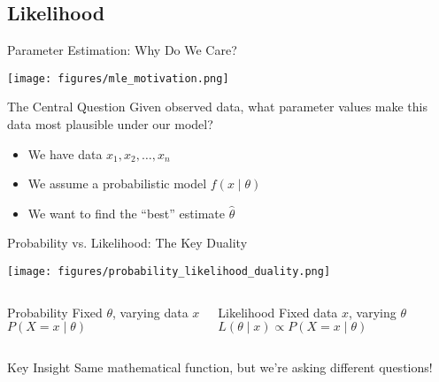 
\subsection{Likelihood}

\begin{frame}{Parameter Estimation: Why Do We Care?}
  \footnotesize
  \begin{center}
    \texttt{[image: figures/mle\_motivation.png]}
  \end{center}
  \vspace{-0.7em}
  \begin{block}{The Central Question}
    \small Given observed data, what parameter values make this data most plausible under our model?
  \end{block}
  \vspace{-0.1em}
  \begin{itemize}
    \item We have data \(x_1, x_2, \ldots, x_n\)
    \item We assume a probabilistic model \(f(x \mid \theta)\)
    \item We want to find the ``best'' estimate \(\hat{\theta}\)
  \end{itemize}
\end{frame}

\begin{frame}{Probability vs. Likelihood: The Key Duality}
  \begin{center}
    \texttt{[image: figures/probability\_likelihood\_duality.png]}
  \end{center}
  \vspace{-0.7em}
  \begin{columns}[T]
  \begin{block}{Probability}
    \small Fixed \(\theta\), varying data \(x\)\\
    \(P(X = x \mid \theta)\)
  \end{block}
  \begin{block}{Likelihood}
    \small Fixed data \(x\), varying \(\theta\)\\
    \(L(\theta \mid x) \propto P(X = x \mid \theta)\)
  \end{block}
  \end{columns}
  \vspace{-0.1em}
  \begin{exampleblock}{Key Insight}
    \small Same mathematical function, but we're asking different questions!
  \end{exampleblock}
\end{frame}

